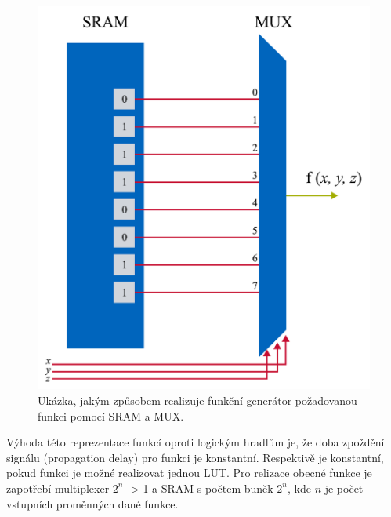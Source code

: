 \documentclass[a4paper, twoside, 11pt]{article}
\begin{document}
	\begin{minipage}[t]{0.45\textwidth}
		\begin{figure}[H]
			\centering
				\includegraphics[width=1\textwidth]{src/pdf/fpga-function-generator.pdf} 
				\caption{Ukázka, jakým způsobem realizuje funkční generátor požadovanou funkci pomocí SRAM a MUX.}
				\label{fig:fpga-function-generator}
		\end{figure}
	\end{minipage}

	\vspace*{0.5cm}
	Výhoda této reprezentace funkcí oproti logickým hradlům je, že doba zpoždění signálu (propagation delay) pro funkci je konstantní. Respektivě je konstantní, pokud funkci je možné realizovat jednou LUT. Pro relizace obecné funkce je zapotřebí multiplexer $2^{n}$ -> 1 a SRAM s počtem buněk $2^{n}$, kde $n$ je počet vstupních proměnných dané funkce. \cite{Sass2010}
\end{document}
